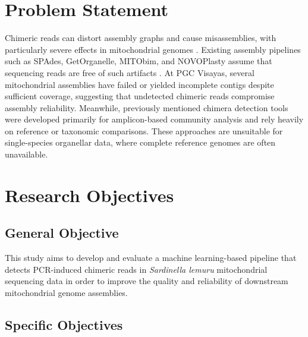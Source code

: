 \section{Problem Statement}

Chimeric reads can distort assembly graphs and cause misassemblies, with particularly severe effects in mitochondrial genomes \citep{Boore1999,Cameron2014}. Existing assembly pipelines such as SPAdes, GetOrganelle, MITObim, and NOVOPlasty assume that sequencing reads are free of such artifacts \citep{Bankevich2012,Hahn2013,Dierckxsens2017,Jin2020}. At PGC Visayas, several mitochondrial assemblies have failed or yielded incomplete contigs despite sufficient coverage, suggesting that undetected chimeric reads compromise assembly reliability. Meanwhile, previously mentioned chimera detection tools were developed primarily for amplicon-based community analysis and rely heavily on reference or taxonomic comparisons. These approaches are unsuitable for single-species organellar data, where complete reference genomes are often unavailable.

\section{Research Objectives}
\label{sec:researchobjectives}

\subsection{General Objective}
\label{sec:generalobjective}

This study aims to develop and evaluate a machine learning-based pipeline that detects PCR-induced chimeric reads in \textit{Sardinella lemuru} mitochondrial sequencing data in order to improve the quality and reliability of downstream mitochondrial genome assemblies.

\subsection{Specific Objectives}
\label{sec:specificobjectives}

